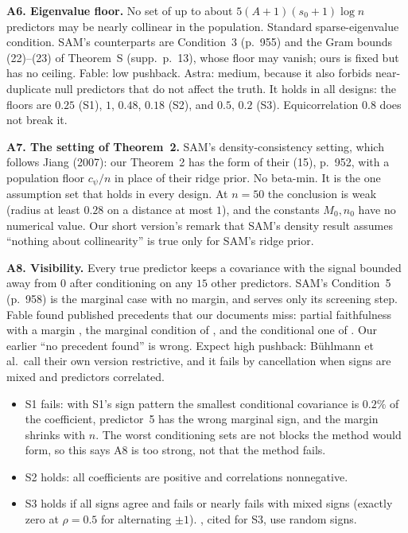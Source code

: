 \documentclass[11pt]{article}
\newcommand{\sz}{s_0}
\begin{document}
\textbf{A6. Eigenvalue floor.} No set of up to about $5(A+1)(\sz+1)\log n$ predictors may be nearly collinear in the
population. Standard sparse-eigenvalue condition. SAM's counterparts are Condition~3 (p.~955) and the Gram bounds
(22)--(23) of Theorem~S (supp.~p.~13), whose floor may vanish; ours is fixed but has no ceiling. Fable: low pushback.
Astra: medium, because it also forbids near-duplicate null predictors that do not affect the truth. It holds in all
designs: the floors are $0.25$ (S1), $1$, $0.48$, $0.18$ (S2), and $0.5$, $0.2$ (S3). Equicorrelation $0.8$ does not
break it.

\textbf{A7. The setting of Theorem~2.} SAM's density-consistency setting, which follows Jiang (2007): our Theorem~2 has
the form of their (15), p.~952, with a population floor $c_\psi/n$ in place of their ridge prior. No beta-min. It is the
one assumption set that holds in every design. At $n=50$ the conclusion is weak (radius at least $0.28$ on a distance at
most $1$), and the constants $M_0,n_0$ have no numerical value. Our short version's remark that SAM's density result
assumes ``nothing about collinearity'' is true only for SAM's ridge prior.

\textbf{A8. Visibility.} Every true predictor keeps a covariance with the signal bounded away from $0$ after
conditioning on any $15$ other predictors. SAM's Condition~5 (p.~958) is the marginal case with no margin, and serves
only its screening step. Fable found published precedents that our documents miss: partial faithfulness with a margin
\citep[(D4) of][]{BuhlmannKalischMaathuis2010}, the marginal condition of \citet{FanLv2008}, and the conditional one of
\citet{BarutFanVerhasselt2016}. Our earlier ``no precedent found'' is wrong. Expect high pushback: Bühlmann et al.\ call
their own version restrictive, and it fails by cancellation when signs are mixed and predictors correlated.
\begin{itemize}
  \item S1 fails: with S1's sign pattern the smallest conditional covariance is $0.2\%$ of the coefficient, predictor~5
    has the wrong marginal sign, and the margin shrinks with $n$. The worst conditioning sets are not blocks the method
    would form, so this says A8 is too strong, not that the method fails.
  \item S2 holds: all coefficients are positive and correlations nonnegative.
  \item S3 holds if all signs agree and fails or nearly fails with mixed signs (exactly zero at $\rho=0.5$ for alternating
    $\pm1$). \citet{ShinBhattacharyaJohnson2018}, cited for S3, use random signs.
\end{itemize}
\end{document}
